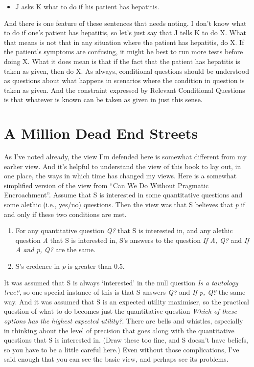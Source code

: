 \documentclass[
  10pt,
  letterpaper,
  twoside]{scrbook}
\providecommand{\tightlist}{%
  \setlength{\itemsep}{0pt}\setlength{\parskip}{0pt}}\usepackage{longtable,booktabs,array}
\begin{document}
\begin{itemize}
\tightlist
\item
  J asks K what to do if his patient has hepatitis.
\end{itemize}

And there is one feature of these sentences that needs noting. I don't
know what to do if one's patient has hepatitis, so let's just say that J
tells K to do X. What that means is not that in any situation where the
patient has hepatitis, do X. If the patient's symptoms are confusing, it
might be best to run more tests before doing X. What it does mean is
that if the fact that the patient has hepatitis is taken as given, then
do X. As always, conditional questions should be understood as questions
about what happens in scenarios where the condition in question is taken
as given. And the constraint expressed by Relevant Conditional Questions
is that whatever is known can be taken as given in just this sense.

\section{A Million Dead End Streets}\label{sec-mychanges}

As I've noted already, the view I'm defended here is somewhat different
from my earlier view. And it's helpful to understand the view of this
book to lay out, in one place, the ways in which time has changed my
views. Here is a somewhat simplified version of the view from ``Can We
Do Without Pragmatic Encroachment''. Assume that S is interested in some
quantitative questions and some alethic (i.e., yes/no) questions. Then
the view was that S believes that \emph{p} if and only if these two
conditions are met.

\begin{enumerate}
\def\labelenumi{\arabic{enumi}.}
\tightlist
\item
  For any quantitative question \emph{Q?} that S is interested in, and
  any alethic question \emph{A} that S is interested in, S's answers to
  the question \emph{If A, Q?} and \emph{If A and p, Q?} are the same.
\item
  S's credence in \emph{p} is greater than 0.5.
\end{enumerate}

It was assumed that S is always `interested' in the null question
\emph{Is a tautology true?}, so one special instance of this is that S
answers \emph{Q?} and \emph{If p, Q?} the same way. And it was assumed
that S is an expected utility maximiser, so the practical question of
what to do becomes just the quantitative question \emph{Which of these
options has the highest expected utility?}. There are bells and
whistles, especially in thinking about the level of precision that goes
along with the quantitative questions that S is interested in. (Draw
these too fine, and S doesn't have beliefs, so you have to be a little
careful here.) Even without those complications, I've said enough that
you can see the basic view, and perhaps see its problems.
\end{document}
